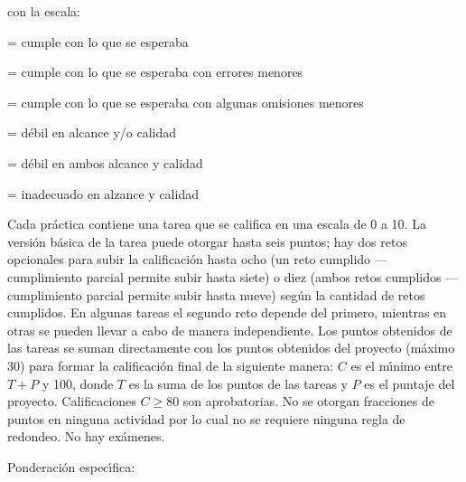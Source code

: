 \documentclass[10 pt]{article}
\begin{document}
  con la escala:
  \begin{description}[itemsep=0em]
  \item[5]{= cumple con lo que se esperaba}
  \item[4]{= cumple con lo que se esperaba con errores menores}
  \item[3]{= cumple con lo que se esperaba con algunas omisiones menores}    
  \item[2]{= d\'{e}bil en alcance y/o calidad}
  \item[1]{= d\'{e}bil en ambos alcance y calidad}
  \item[0]{= inadecuado en alzance y calidad}
  \end{description}

  Cada pr\'{a}ctica contiene una tarea que se califica en una escala de 0
  a 10. La versi\'{o}n b\'{a}sica de la tarea puede otorgar hasta seis puntos;
  hay dos retos opcionales para subir la calificaci\'{o}n hasta ocho (un
  reto cumplido --- cumplimiento parcial permite subir hasta siete) o
  diez (ambos retos cumplidos --- cumplimiento parcial permite subir
  hasta nueve) seg\'{u}n la cantidad de retos cumplidos. En algunas tareas
  el segundo reto depende del primero, mientras en otras se pueden
  llevar a cabo de manera independiente.  Los puntos obtenidos de las
  tareas se suman directamente con los puntos obtenidos del proyecto
  (m\'{a}ximo 30) para formar la calificaci\'{o}n final de la siguiente
  manera: $C$ es el m\'{\i}nimo entre $T + P$ y 100, donde $T$ es la suma
  de los puntos de las tareas y $P$ es el puntaje del proyecto.
  Calificaciones $C \geq 80$ son aprobatorias. No se otorgan
  fracciones de puntos en ninguna actividad por lo cual no se requiere
  ninguna regla de redondeo. No hay ex\'{a}menes.
  
  Ponderaci\'{o}n espec\'{\i}fica:

  
\end{document}
